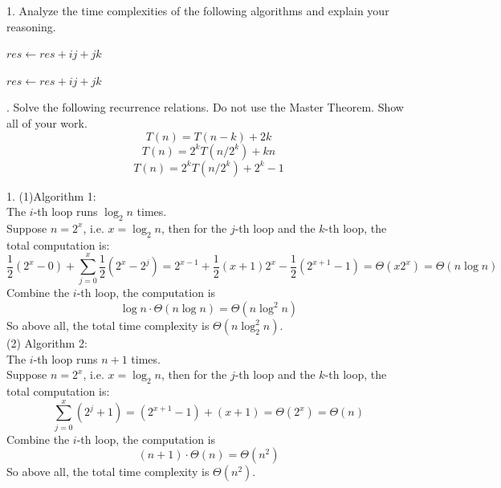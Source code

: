 \problem{}

1. Analyze the time complexities of the following algorithms and explain your reasoning.

\begin{algorithm}
\caption{}
\begin{algorithmic}
            \State $res \gets res + ij + jk$
        \EndFor
    \EndFor
\EndFor
\end{algorithmic}
\end{algorithm}


\begin{algorithm}
\caption{}
\begin{algorithmic}
            \State $res \gets res + ij + jk$
        \EndFor
    \EndFor
\EndFor
\end{algorithmic}
\end{algorithm}

. Solve the following recurrence relations. Do not use the Master Theorem. Show all of your work.
$$T(n) = T(n-k) + 2k$$
$$T(n) = 2^kT(n/2^k) + kn$$
$$T(n) = 2^kT(n/2^k) + 2^k-1$$


\solution{}

1. (1)Algorithm 1:\\
The $i$-th loop runs $\log_{2}{n}$ times.\\
Suppose $n=2^x$, i.e. $x=\log_{2}{n}$, then for the $j$-th loop and the $k$-th loop, the total computation is:
$$\dfrac{1}{2}(2^x-0)+\sum_{j=0}^{x}\dfrac{1}{2}(2^x-2^j)=2^{x-1}+\dfrac{1}{2}(x+1)2^x-\dfrac{1}{2}(2^{x+1}-1)=\Theta(x2^x)=\Theta(n\log n)$$
Combine the $i$-th loop, the computation is
$$\log n\cdot \Theta(n\log n)=\Theta(n\log^2 n)$$
So above all, the total time complexity is $\Theta(n\log_2^2{n})$.\\

(2) Algorithm 2:\\
The $i$-th loop runs $n+1$ times.\\
Suppose $n=2^x$, i.e. $x=\log_{2}{n}$, then for the $j$-th loop and the $k$-th loop, the total computation is:
$$\sum_{j=0}^{x}(2^j+1)=(2^{x+1}-1)+(x+1)=\Theta(2^x)=\Theta(n)$$
Combine the $i$-th loop, the computation is
$$(n+1)\cdot \Theta(n)=\Theta(n^2)$$
So above all, the total time complexity is $\Theta(n^2)$.\\

